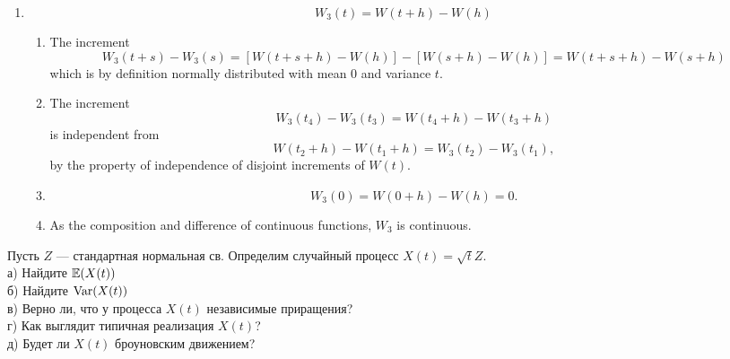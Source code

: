 \begin{problem}
\begin{sol}
\begin{enumerate}
  \item
  \[
      W_3(t) = W(t+h) - W(h)
  \]
  \begin{enumerate}
    \item
    The increment
    \[
        W_3(t+s) - W_3(s) = [ W(t+s+h) - W(h) ] - [ W(s+h) -
        W(h) ] = W(t+s+h) - W(s+h)
    \]
    which is by definition normally distributed with mean $
    0 $ and variance $ t $.

    \item
    The increment
    \[
        W_3(t_4) - W_3(t_3) = W(t_4+h) - W(t_3+h)
    \]
    is independent from
    \[
        W(t_2+h) - W(t_1+h) = W_3(t_2) - W_3(t_1),
    \]
    by the property of independence of disjoint increments
    of $ W(t) $.

    \item
    \[
        W_3(0) = W(0+h) - W(h) = 0.
    \]

    \item
    As the composition and difference of continuous
    functions, $ W_3 $ is continuous.
    \end{enumerate}
  \end{enumerate}

\end{sol}
\end{problem}

\begin{problem}
Пусть $Z$ — стандартная нормальная св. Определим случайный процесс $X(t)=\sqrt{t}Z$. \\
а) Найдите $\mathbb{E}(X(t))$ \\
б) Найдите $\operatorname{Var}(X(t))$ \\
в) Верно ли, что у процесса $X(t)$ независимые приращения? \\
г) Как выглядит типичная реализация $X(t)$? \\
д) Будет ли $X(t)$ броуновским движением?

\begin{sol}
\end{sol}
\end{problem}




